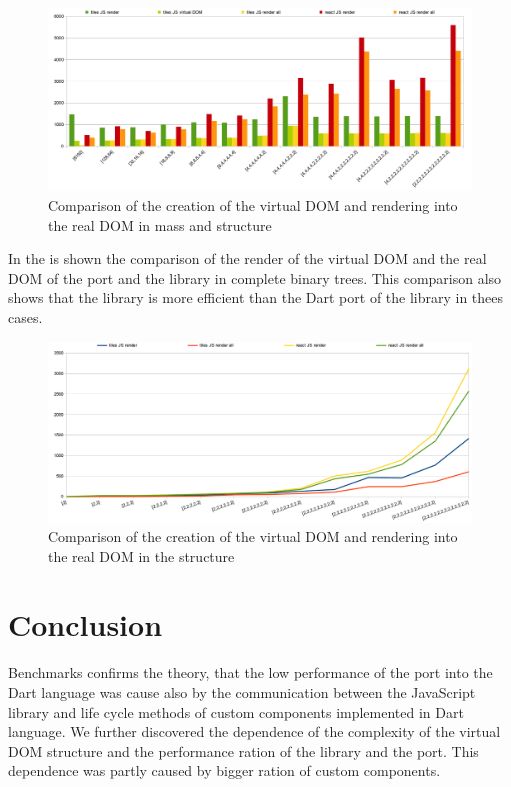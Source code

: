 	\begin{figure}[h]
	\centering  
		\includegraphics[scale=0.5]{images/benchmarks/mvs_render_vs_virtual_.png}
		\caption{Comparison of the creation of the virtual DOM and rendering into the real DOM in mass and structure}
		\label{img:benchmarks-mass-vs-structure-virtual-vs-real}
	\end{figure}

	In the  is shown the comparison of the render of the virtual DOM and the real DOM of the \react port and the \tiles library in complete binary trees. 
	This comparison also shows that the \tiles library is more efficient than the Dart port of the \react library in thees cases.

	\begin{figure}[h]
	\centering  
		\includegraphics[scale=0.5]{images/benchmarks/s_render_all.png}
		\caption{Comparison of the creation of the virtual DOM and rendering into the real DOM in the structure}
		\label{img:benchmarks-structure-virtual-vs-real}
	\end{figure}

\section{Conclusion}\label{sec:benchmarks-conclusion}

	Benchmarks confirms the theory, that the low performance of the \react port into the Dart language was cause also by the communication between the JavaScript \react library 
	and life cycle methods of custom components implemented in Dart language.
	We further discovered the dependence of the complexity of the virtual DOM structure and the performance ration of the \tiles library and the \react port.
	This dependence was partly caused by bigger ration of custom components.

